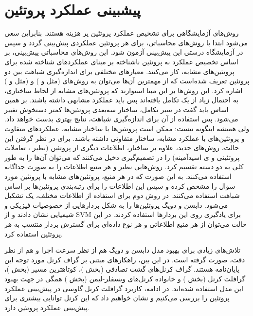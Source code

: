 \section{پیشبینی عملکرد پروتئین}\label{sec:protein-function-prediction-review}
 روش‌های آزمایشگاهی برای تشخیص عملکرد پروتئین پر هزینه هستند. بنابراین سعی می‌شود ابتدا با روش‌های محاسباتی، برای هر پروتئین عملکردی پیش‌بینی گردد و سپس در آزمایشگاه درستی این پیش‌بینی آزمون شود. این روش‌های محاسباتی پیش‌بینی، بر اساس تخصیص عملکرد به پروتئین ناشناخته بر مبنای عملکردهای شناخته شده برای پروتئین‌های مشابه، کار می‌کنند. معیارهای مختلفی برای اندازه‌گیری شباهت بین دو پروتئین تعریف شده‌است که از مهمترین آن‌ها می‌توان به روش‌های  (مثل  و ) و  (مثل  و ) اشاره کرد. این روش‌ها بر این مبنا استوارند که پروتئین‌های مشابه از لحاظ ساختاری، به احتمال زیاد از یک  تکامل یافته‌اند پس باید عملکرد مشابهی داشته باشند. بر همین اساس باید گفت در سیر تکامل، ساختار سه‌بعدی پروتئین‌ها کمتر دستخوش تغییر می‌شود. پس استفاده از آن برای اندازه‌گیری شباهت، نتایج بهتری بدست خواهد داد. ولی همیشه اینگونه نیست: ممکن است پروتئین‌ها با ساختار مشابه، عملکردهای متفاوت و پروتئین‌های با عملکرد مشابه، ساختار متفاوتی داشته باشند. برای در نظر گرفتن این حالت، روش‌های جدید، علاوه بر ساختار، اطلاعات دیگری از پروتئین (نظیر ، تعاملات پروتئینی و ی اسیدآمینه) را در تصمیم‌گیری دخیل می‌کنند که می‌توان آن‌ها را به طور کلی به دو دسته تقسیم کرد. روش‌هایی نظیر  و  هر منبع اطلاعات را به صورت جداگانه استفاده می‌کنند. به این صورت که در هر منبع، پروتئین‌های مشابه با پروتئین مورد سؤال را مشخص کرده و سپس این اطلاعات را برای رتبه‌بندی پروتئین‌ها بر اساس شباهت استفاده می‌کنند. در روش دوم برای استفاده از اطلاعات مختلف، یک  تشکیل می‌شود. دابسن و دویگ  پروتئین‌ها را به شکل بردارهایی از خصوصیات فیزیکی و شیمیایی نشان دادند و از SVM برای یادگیری روی این بردارها استفاده کردند. در این حالت می‌توان از هر منبع اطلاعاتی و هر نوع داده‌ای برای گسترش بردار منتسب به هر پروتئین استفاده کرد.

تلاش‌های زیادی برای بهبود مدل دابسن و دویگ هم از نظر سرعت اجرا و هم از نظر دقت، صورت گرفته است. در این بین، راهکارهای مبتنی بر گراف کرنل مورد توجه این پایان‌نامه هستند. گراف کرنل‌های گشت تصادفی (بخش )، کوتاهترین مسیر (بخش )، گرافلت کرنل (بخش ) و خانواده کرنل‌های ویسفلر-لیمن (بخش ) همگی در جهت بهبود این مدل استفاده شده‌اند. در ادامه، کاربرد گرافلت کرنل گاوسی در پیش‌بینی عملکرد پروتئین را بررسی می‌کنیم و نشان خواهیم داد که این کرنل توانایی بیشتری برای پیش‌بینی عملکرد پروتئین دارد.

